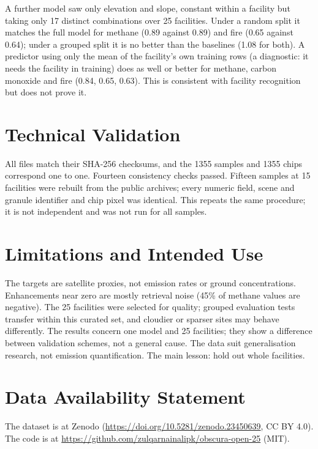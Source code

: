 \documentclass[notspecified,datadescriptor,submit,oneauthor]{Definitions/mdpi}
\begin{document}
A further model saw only elevation and slope, constant within a facility but taking only 17 distinct combinations over 25 facilities. Under a random split it matches the full model for methane (0.89 against 0.89) and fire (0.65 against 0.64); under a grouped split it is no better than the baselines (1.08 for both). A predictor using only the mean of the facility's own training rows (a diagnostic: it needs the facility in training) does as well or better for methane, carbon monoxide and fire (0.84, 0.65, 0.63). This is consistent with facility recognition but does not prove it.

\section{Technical Validation}

All files match their SHA-256 checksums, and the 1355 samples and 1355 chips correspond one to one. Fourteen consistency checks passed. Fifteen samples at 15 facilities were rebuilt from the public archives; every numeric field, scene and granule identifier and chip pixel was identical. This repeats the same procedure; it is not independent and was not run for all samples.

\section{Limitations and Intended Use}

The targets are satellite proxies, not emission rates or ground concentrations. Enhancements near zero are mostly retrieval noise (45\% of methane values are negative). The 25 facilities were selected for quality; grouped evaluation tests transfer within this curated set, and cloudier or sparser sites may behave differently. The results concern one model and 25 facilities; they show a difference between validation schemes, not a general cause. The data suit generalisation research, not emission quantification. The main lesson: hold out whole facilities.

\vspace{6pt}



\section*{Data Availability Statement}
The dataset is at Zenodo (\url{https://doi.org/10.5281/zenodo.23450639}, CC BY 4.0). The code is at \url{https://github.com/zulqarnainalipk/obscura-open-25} (MIT).
\end{document}
